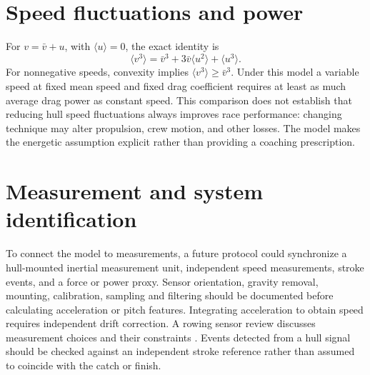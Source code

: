 \documentclass[11pt]{article}
\begin{document}
\section{Speed fluctuations and power}
For $v=\bar v+u$, with $\langle u\rangle=0$, the exact identity is
\begin{equation}\langle v^3\rangle=\bar v^3+3\bar v\langle u^2\rangle+\langle u^3\rangle.\end{equation}
For nonnegative speeds, convexity implies $\langle v^3\rangle\geq\bar v^3$. Under this model a variable speed at fixed mean speed and fixed drag coefficient requires at least as much average drag power as constant speed. This comparison does not establish that reducing hull speed fluctuations always improves race performance: changing technique may alter propulsion, crew motion, and other losses. The model makes the energetic assumption explicit rather than providing a coaching prescription.

\section{Measurement and system identification}
To connect the model to measurements, a future protocol could synchronize a hull-mounted inertial measurement unit, independent speed measurements, stroke events, and a force or power proxy. Sensor orientation, gravity removal, mounting, calibration, sampling and filtering should be documented before calculating acceleration or pitch features. Integrating acceleration to obtain speed requires independent drift correction. A rowing sensor review discusses measurement choices and their constraints \cite{worsey}. Events detected from a hull signal should be checked against an independent stroke reference rather than assumed to coincide with the catch or finish.
\end{document}
